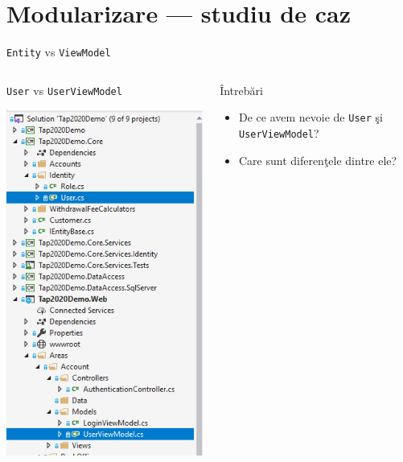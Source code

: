\documentclass[presentation]{beamer}
\begin{document}
\section{Modularizare --- studiu de caz}
\label{sec:org329f82d}
\begin{frame}[label={sec:org3c2dd7a},fragile]{\texttt{Entity} vs \texttt{ViewModel}}
 \begin{columns}
\begin{column}{0.4\columnwidth}
\begin{block}{\texttt{User} vs \texttt{UserViewModel}}
\begin{center}
\includegraphics[height=.8\textheight]{img/entity-vs-view-model.png}
\end{center}
\end{block}
\end{column}
\begin{column}{0.6\columnwidth}
\begin{block}{Întrebări}
\begin{itemize}
\item De ce avem nevoie de \texttt{User} şi \texttt{UserViewModel}?
\item Care sunt diferenţele dintre ele?
\end{itemize}
\end{block}
\end{column}
\end{columns}
\end{frame}
\end{document}
